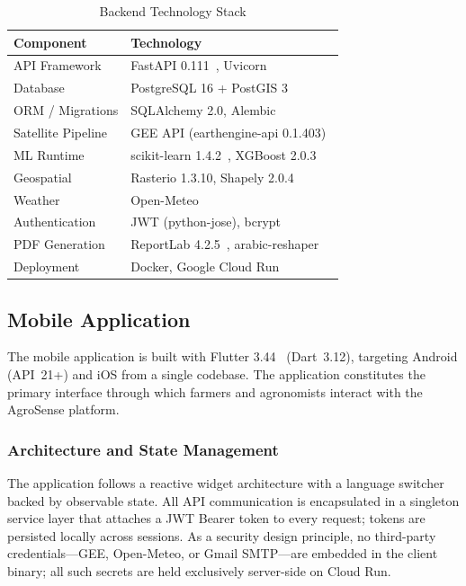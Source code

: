 \documentclass[conference]{IEEEtran}
\begin{document}
\begin{table}[htbp]
  \caption{Backend Technology Stack}
  \label{tab:stack}
  \centering
  \begin{tabular}{ll}
    \toprule
    \textbf{Component} & \textbf{Technology} \\
    \midrule
    API Framework      & FastAPI 0.111~\cite{fastapi}, Uvicorn \\
    Database           & PostgreSQL 16 + PostGIS 3~\cite{postgis} \\
    ORM / Migrations   & SQLAlchemy 2.0, Alembic \\
    Satellite Pipeline & GEE API (earthengine-api 0.1.403)~\cite{gorelick2017} \\
    ML Runtime         & scikit-learn 1.4.2~\cite{sklearn}, XGBoost 2.0.3~\cite{chen2016xgboost} \\
    Geospatial         & Rasterio 1.3.10, Shapely 2.0.4 \\
    Weather            & Open-Meteo~\cite{zippenfenig2023} \\
    Authentication     & JWT (python-jose), bcrypt \\
    PDF Generation     & ReportLab 4.2.5~\cite{reportlab}, arabic-reshaper \\
    Deployment         & Docker, Google Cloud Run \\
    \bottomrule
  \end{tabular}
\end{table}

\subsection{Mobile Application}

The mobile application is built with Flutter 3.44~\cite{flutter} (Dart~3.12),
targeting Android (API~21+) and iOS from a single codebase. The application
constitutes the primary interface through which farmers and agronomists interact
with the AgroSense platform.

\subsubsection{Architecture and State Management}
The application follows a reactive widget architecture with a language switcher
backed by observable state. All API communication is encapsulated in a singleton
service layer that attaches a JWT Bearer token to every request; tokens are
persisted locally across sessions. As a security design principle, no
third-party credentials---GEE, Open-Meteo, or Gmail SMTP---are embedded in the
client binary; all such secrets are held exclusively server-side on Cloud Run.
\end{document}
